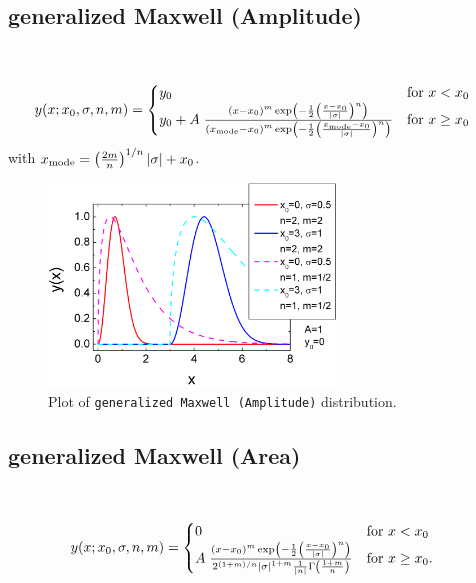 \clearpage
\subsection{generalized Maxwell (Amplitude)} ~\\
\label{sec:generalizedMaxwellAmplitude}

\begin{align}
y(x; x_0, \sigma, n, m) &=
\begin{cases}
y_0 & \mbox{for~} x<x_0 \\
y_0+ A\; \frac{\left(x-x_0\right)^m
\exp\left(-\frac{1}{2}\left(\frac{x-x_0}{\abs{\sigma}}\right)^n\right)}{
    \left(x_\text{mode}-x_0\right)^m
\exp\left(-\frac{1}{2}\left(\frac{x_\text{mode}-x_0}{\abs{\sigma}}\right)^n\right)}
   & \mbox{for~} x \geq x_0 \\
\end{cases}
\end{align}
with $x_\text{mode} = \left(\frac{2m}{n}\right)^{1/n}\abs{\sigma}+x_0$.

\begin{figure}[htb]
\begin{center}
\includegraphics[width=0.6824\textwidth]{generalizedMaxwellAmplitude.png}
\end{center}
\caption{Plot of \texttt{generalized Maxwell (Amplitude)}
distribution.} \label{fig:generalizedMaxwellAmplitude}
\end{figure}

\clearpage
\subsection{generalized Maxwell (Area)} ~\\
\label{sec:generalizedMaxwellArea}

\begin{align}
y(x; x_0, \sigma, n, m) &=
\begin{cases}
0 & \mbox{for~} x<x_0 \\
   A\; \frac{\left(x-x_0\right)^m \exp\left(-\frac{1}{2}\left(\frac{x-x_0}{\abs{\sigma}}\right)^n\right)}{
   2^{(1+m)/n}\abs{\sigma}^{1+m} \frac{1}{\abs{n}}\Gamma\left(\frac{1+m}{n}\right)}
   & \mbox{for~} x \geq x_0 .\\
\end{cases}
\end{align}

